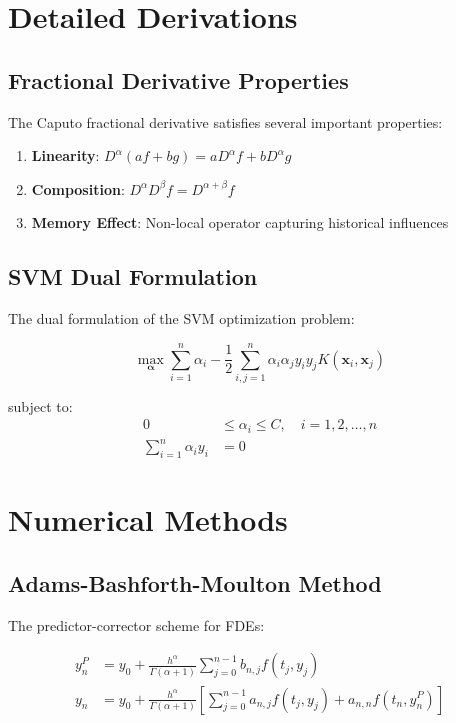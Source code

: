 \documentclass[12pt,a4paper]{report}
\begin{document}
\section{Detailed Derivations}

\subsection{Fractional Derivative Properties}

The Caputo fractional derivative satisfies several important properties:

\begin{enumerate}
    \item \textbf{Linearity}: $D^\alpha(af + bg) = aD^\alpha f + bD^\alpha g$
    \item \textbf{Composition}: $D^\alpha D^\beta f = D^{\alpha + \beta} f$
    \item \textbf{Memory Effect}: Non-local operator capturing historical influences
\end{enumerate}

\subsection{SVM Dual Formulation}

The dual formulation of the SVM optimization problem:

\begin{equation}
\max_{\boldsymbol{\alpha}} \sum_{i=1}^{n} \alpha_i - \frac{1}{2}\sum_{i,j=1}^{n} \alpha_i \alpha_j y_i y_j K(\mathbf{x}_i, \mathbf{x}_j)
\end{equation}

subject to:
\begin{align}
0 &\leq \alpha_i \leq C, \quad i = 1, 2, \ldots, n \\
\sum_{i=1}^{n} \alpha_i y_i &= 0
\end{align}

\section{Numerical Methods}

\subsection{Adams-Bashforth-Moulton Method}

The predictor-corrector scheme for FDEs:

\begin{align}
y_n^P &= y_0 + \frac{h^\alpha}{\Gamma(\alpha+1)} \sum_{j=0}^{n-1} b_{n,j} f(t_j, y_j) \\
y_n &= y_0 + \frac{h^\alpha}{\Gamma(\alpha+1)} \left[ \sum_{j=0}^{n-1} a_{n,j} f(t_j, y_j) + a_{n,n} f(t_n, y_n^P) \right]
\end{align}
\end{document}
